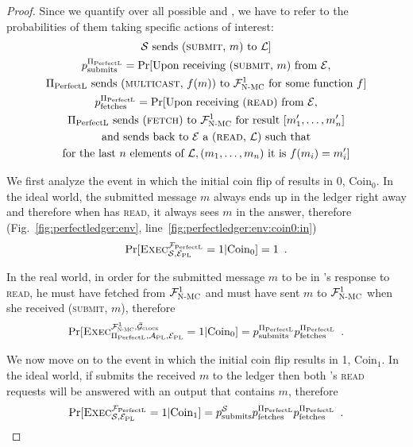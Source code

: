 \begin{proof}
    Since we quantify over all possible \simulator{} and \perfectprot, we have
    to refer to the probabilities of them taking specific actions of interest:
    \begin{gather*}
      \text{\ensuremath{\mathcal{S}}{} sends (\textsc{submit}, $m$) to $\mathcal{L}$}] \\
      p^{\Pi_{\mathrm{PerfectL}}}_{\mathrm{submits}} = \Pr[\text{Upon receiving (\textsc{submit}, $m$) from
      \ensuremath{\mathcal{E}},} \\
      \text{\ensuremath{\Pi_{\mathrm{PerfectL}}}{} sends (\textsc{multicast}, $f(m)$) to
      $\mathcal{F}_{\textsc{N-MC}}^1$ for some function $f$}]
      \\
      p^{\Pi_{\mathrm{PerfectL}}}_{\mathrm{fetches}} = \Pr[\text{Upon receiving (\textsc{read}) from \ensuremath{\mathcal{E}},}
      \\
      \text{\ensuremath{\Pi_{\mathrm{PerfectL}}}{} sends (\textsc{fetch}) to $\mathcal{F}_{\textsc{N-MC}}^1$ for result
      } [m_1', \dots, m_n'] \\
      \text{and sends back to \ensuremath{\mathcal{E}}{} a (\textsc{read}, $\mathcal{L}$)
      such that} \\
      \text{for the last $n$ elements of $\mathcal{L}, (m_1, \dots, m_n)$ it is
      } f(m_i) = m_i']
    \end{gather*}

    We first analyze the event in which the initial coin flip of \environment{}
    results in 0, $\mathrm{Coin}_0$. In the ideal world, the submitted message
    $m$ always ends up in the ledger right away and therefore when
    \environment{} has \bob{} \textsc{read}, it always sees $m$ in the answer,
    therefore (Fig.~\ref{fig:perfectledger:env},
    line~\ref{fig:perfectledger:env:coin0:in})
    \begin{equation}
    \label{eq:coin0:ideal}
      \Pr[\textsc{Exec}^{\perfectledger}_{\simulator, \perfectenv} = 1 |
      \mathrm{Coin}_0] = 1 \enspace.
    \end{equation}

    In the real world, in order for the submitted message $m$ to be in \bob's
    response to \textsc{read}, he must have fetched from $\mathcal{F}_{\textsc{N-MC}}^1$ and
    \alice{} must have sent $m$ to $\mathcal{F}_{\textsc{N-MC}}^1$ when she received
    (\textsc{submit}, $m$), therefore
    \begin{equation}
    \label{eq:coin0:real}
      \Pr[\textsc{Exec}^{\FnetworkEd^1, \gFclock}_{\perfectprot, \perfectadv,
      \perfectenv} = 1 | \mathrm{Coin}_0] = \ppsubmits \ppfetches \enspace.
    \end{equation}

    We now move on to the event in which the initial coin flip results in 1,
    $\mathrm{Coin}_1$. In the ideal world, if \simulator{} submits the received
    $m$ to the ledger then both \environment's \textsc{read} requests will be
    answered with an output that contains $m$, therefore
    \begin{equation}
    \label{eq:coin1:ideal}
      \Pr[\textsc{Exec}^{\perfectledger}_{\simulator, \perfectenv} = 1 |
      \mathrm{Coin}_1] = \pssubmits \ppfetches \ppfetches \enspace.
    \end{equation}
  \end{proof}
